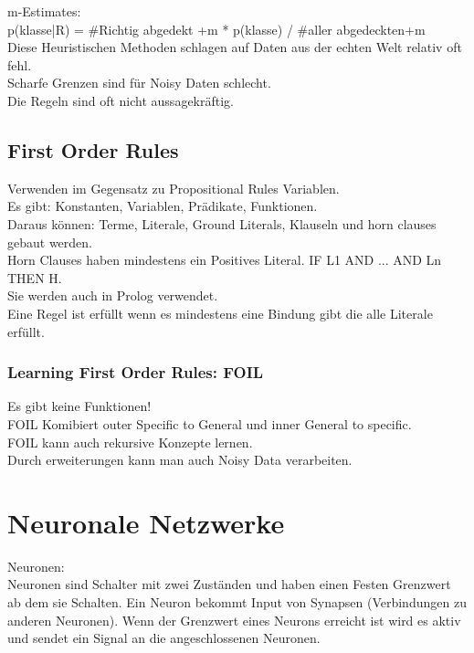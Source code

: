 \documentclass[a4paper]{scrartcl}
\begin{document}
 m-Estimates:\\
  p(klasse|R) = \#Richtig abgedekt +m * p(klasse) / \#aller abgedeckten+m\\
  
  Diese Heuristischen Methoden schlagen auf Daten aus der echten Welt relativ oft fehl.\\
  Scharfe Grenzen sind für Noisy Daten schlecht.\\
  Die Regeln sind oft nicht aussagekräftig.\\
  
  \subsection{First Order Rules}
  Verwenden im Gegensatz zu Propositional Rules Variablen.\\
  Es gibt: Konstanten, Variablen, Prädikate, Funktionen.\\
  Daraus können: Terme, Literale, Ground Literals, Klauseln und horn clauses gebaut werden.\\
  Horn Clauses haben mindestens ein Positives Literal. IF L1 AND ... AND Ln THEN H.\\
  Sie werden auch in Prolog verwendet.\\
  Eine Regel ist erfüllt wenn es mindestens eine Bindung gibt die alle Literale erfüllt.\\
  \subsubsection{Learning First Order Rules: FOIL}
  Es gibt keine Funktionen!\\
  FOIL Komibiert outer Specific to General und inner General to specific.\\
  FOIL kann auch rekursive Konzepte lernen.\\
  Durch erweiterungen kann man auch Noisy Data verarbeiten.\\
  
  \section{Neuronale Netzwerke}
  Neuronen:\\
  Neuronen sind Schalter mit zwei Zuständen und haben einen Festen Grenzwert ab dem sie Schalten. Ein Neuron bekommt Input von Synapsen (Verbindungen zu anderen Neuronen). Wenn der Grenzwert eines Neurons erreicht ist wird es aktiv und sendet ein Signal an die angeschlossenen Neuronen.\\
\end{document}
